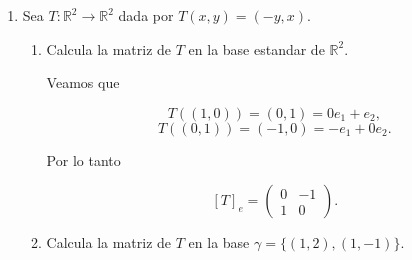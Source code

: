 \documentclass[letterpaper]{article}
\theoremstyle{definition}
\theoremstyle{lemathm}
\theoremstyle{lemademthm}
\newcommand{\R}{\mathbb{R}}
\begin{document}
\begin{enumerate}
\begin{proof}
			Entonces

			\begin{align*}
				&[T^2 - (a+d)T + (ad-bc)Id_V]_\beta\\
				&= [T^2]_\beta - [(a+d)T]_\beta + [(ad-bc)Id_V]_\beta\\
				&= \begin{pmatrix}
					a^2 + bc & ab + bd\\
					ac + cd & bc + d^2
				\end{pmatrix} - \begin{pmatrix}
					a^2 + ad & ab + bd\\
					ac + cd & ad + d^2
				\end{pmatrix} + \begin{pmatrix}
					ad - bc & 0\\
					0 & ad - bc
				\end{pmatrix}\\
				&= \begin{pmatrix}
					0 & 0\\
					0 & 0
				\end{pmatrix}.
			\end{align*}

			Como 

			\[[T_0]_\beta = \begin{pmatrix}
				0 & 0\\
				0 & 0
			\end{pmatrix},\]

			por el corolario del Teorema $2.6$ concluimos que $T^2 - (a+d)T + (ad-bc)Id_V = T_0$.
		
		\end{proof}

		\item Sea $T: \R^2 \rightarrow \R^2$ dada por $T(x,y) = (-y,x)$.
		
		\begin{enumerate}
			\item Calcula la matriz	de $T$ en la base estandar de $\R^2$.
			
			Veamos que

			\[T((1,0)) = (0,1) = 0e_1 + e_2,\]
			\[T((0,1)) = (-1,0) = -e_1 + 0e_2.\]

			Por lo tanto

			\[[T]_e = \begin{pmatrix}
				0 & -1\\
				1 & 0
			\end{pmatrix}.\]

			\item Calcula la matriz	de $T$ en la base $\gamma = \{(1,2),(1,-1)\}$.
			

\end{enumerate}
\end{enumerate}
\end{document}
